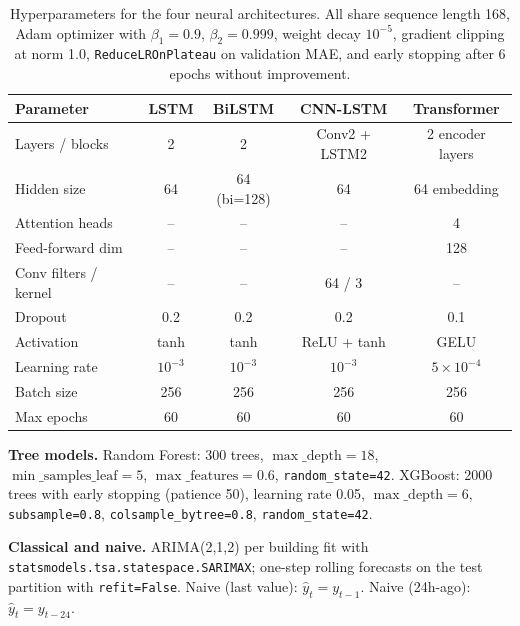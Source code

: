 \documentclass[12pt,a4paper,openany]{report}
\begin{document}
\begin{table}[!htb]
\centering
\caption{Hyperparameters for the four neural architectures. All share sequence length 168, Adam optimizer with $\beta_1{=}0.9$, $\beta_2{=}0.999$, weight decay $10^{-5}$, gradient clipping at norm 1.0, \texttt{ReduceLROnPlateau} on validation MAE, and early stopping after 6 epochs without improvement.}
\begin{tabular}{|l|c|c|c|c|}
\hline
\textbf{Parameter}     & \textbf{LSTM} & \textbf{BiLSTM} & \textbf{CNN-LSTM} & \textbf{Transformer} \\
\hline
Layers / blocks        & 2             & 2              & Conv2 + LSTM2     & 2 encoder layers     \\
Hidden size            & 64            & 64 (bi=128)    & 64                & 64 embedding         \\
Attention heads        & --            & --             & --                & 4                    \\
Feed-forward dim       & --            & --             & --                & 128                  \\
Conv filters / kernel  & --            & --             & 64 / 3            & --                   \\
Dropout                & 0.2           & 0.2            & 0.2               & 0.1                  \\
Activation             & tanh          & tanh           & ReLU + tanh       & GELU                 \\
Learning rate          & $10^{-3}$     & $10^{-3}$      & $10^{-3}$         & $5{\times}10^{-4}$   \\
Batch size             & 256           & 256            & 256               & 256                  \\
Max epochs             & 60            & 60             & 60                & 60                   \\
\hline
\end{tabular}
\end{table}

\textbf{Tree models.} Random Forest: 300 trees, $\max\_\mathrm{depth}{=}18$, $\min\_\mathrm{samples\_leaf}{=}5$, $\max\_\mathrm{features}{=}0.6$, \texttt{random\_state=42}. XGBoost: 2000 trees with early stopping (patience 50), learning rate 0.05, $\max\_\mathrm{depth}{=}6$, \texttt{subsample=0.8}, \texttt{colsample\_bytree=0.8}, \texttt{random\_state=42}.

\textbf{Classical and naive.} ARIMA(2,1,2) per building fit with \texttt{statsmodels.tsa.statespace.SARIMAX}; one-step rolling forecasts on the test partition with \texttt{refit=False}. Naive (last value): $\hat y_t = y_{t-1}$. Naive (24h-ago): $\hat y_t = y_{t-24}$.
\end{document}
